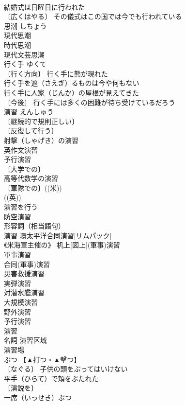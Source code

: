 \documentclass[8pt]{extreport}
\begin{document}
\begin{CJK}{UTF8}{min}
\\	結婚式は日曜日に行われた 
\\	〔広くはやる〕 その儀式はこの国では今でも行われている 
\\	思潮	しちょう	
\\	現代思潮 
\\	時代思潮 
\\	現代文芸思潮 
\\	行く手	ゆくて	
\\	〔行く方向〕 行く手に熊が現れた 
\\	行く手を遮（さえぎ）るものは今や何もない 
\\	行く手に人家（じんか）の屋根が見えてきた 
\\	〔今後〕 行く手には多くの困難が待ち受けているだろう 
\\	演習	えんしゅう	
\\	〔継続的で規則正しい〕
\\	〔反復して行う〕
\\	射撃（しゃげき）の演習 
\\	英作文演習 
\\	予行演習 
\\	〔大学での〕
\\	高等代数学の演習 
\\	〔軍隊での〕((米)) 
\\	((英)) 
\\	演習を行う 
\\	防空演習 
\\	形容詞（相当語句） 
\\	演習 環太平洋合同演習[リムパック] 
\\	《米海軍主催の》 机上[図上](軍事)演習 
\\	軍事演習 
\\	合同(軍事)演習 
\\	災害救援演習 
\\	実弾演習 
\\	対潜水艦演習 
\\	大規模演習 
\\	野外演習 
\\	予行演習 
\\	演習 
\\	名詞 演習区域 
\\	演習場 
\\	ぶつ	【▲打つ・▲撃つ】	
\\	〔なぐる〕 子供の頭をぶってはいけない 
\\	平手（ひらて）で頬をぶたれた 
\\	〔演説を〕 
\\	一席（いっせき）ぶつ 

\end{CJK}
\end{document}
